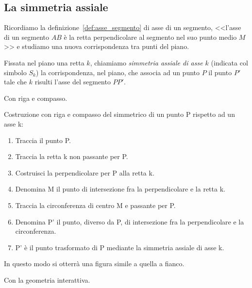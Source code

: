 \subsection{La simmetria assiale}

\noindent\begin{minipage}{0.65\textwidth}\parindent15pt

Ricordiamo la definizione~\ref{def:asse_segmento} di asse di un 
segmento, <<l'asse di un segmento \(AB\) è la retta perpendicolare al 
segmento nel suo punto medio \(M\)>> e studiamo una nuova 
corrispondenza tra punti del piano.
\end{minipage}\hfill
\begin{minipage}{0.25\textwidth}
  \centering 
\end{minipage}
\begin{definizione}
Fissata nel piano una retta \(k\), chiamiamo \emph{simmetria assiale di 
asse \(k\)} (indicata col simbolo \(S_k\)) la corrispondenza, nel piano, 
che associa ad un punto \(P\) il punto \(P'\) tale che \(k\) risulti l'asse 
del segmento \(PP'\).
\end{definizione}

Con riga e compasso.

\begin{procedura}
  Costruzione con riga e compasso del simmetrico di un punto P rispetto ad un 
asse k:
  \begin{enumerate} [nosep]
    \item 
    Traccia il punto P.
    \item 
    Traccia la retta k non passante per P.
    \item 
    Costruisci la perpendicolare per P alla retta k.
    \item 
    Denomina M il punto di intersezione fra la perpendicolare e la retta k.
    \item 
    Traccia la circonferenza di centro M e passante per P.
    \item 
    Denomina P' il punto, diverso da P, di intersezione fra la perpendicolare e 
la circonferenza. 
    \item 
    P' è il punto trasformato di P mediante la simmetria assiale di asse k.
  \end{enumerate}
\end{procedura}
In questo modo si otterrà una figura simile a quella a fianco.

Con la geometria interattiva.


